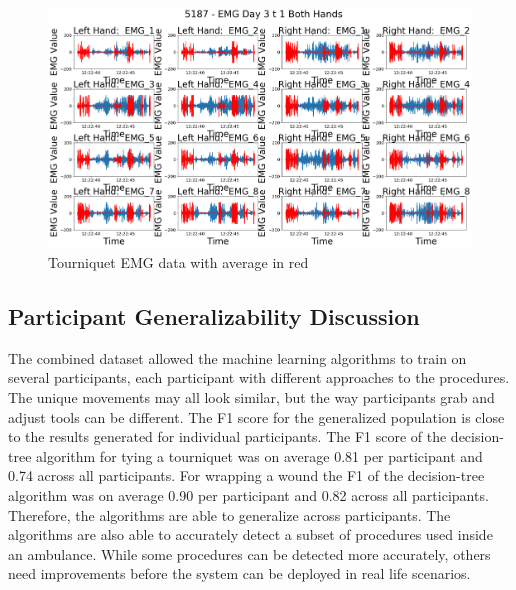 \begin{figure}[!h]
	\centering
	\includegraphics[width=\linewidth]{pictures/5187_EMG_Day3_t_1_average}
	\caption{Tourniquet EMG data with average in red}
	\label{fig:5187emgday3t1average}
\end{figure}

\subsection{Participant Generalizability Discussion}
\label{sec:Results:Generalizability:Discussion}

The combined dataset allowed the machine learning algorithms to train on several participants, each participant with different approaches to the procedures. The unique movements may all look similar, but the way participants grab and adjust tools can be different. 
The F1 score for the generalized population is close to the results generated for individual participants. The F1 score of the decision-tree algorithm for tying a tourniquet was on average 0.81 per participant and 0.74 across all participants. For wrapping a wound the F1 of the decision-tree algorithm was on average 0.90 per participant and 0.82 across all participants. Therefore, the algorithms are able to generalize across participants. The algorithms are also able to accurately detect a subset of procedures used inside an ambulance. While some procedures can be detected more accurately, others need improvements before the system can be deployed in real life scenarios.


